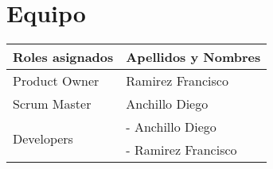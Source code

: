 \chapter{Equipo}

\begin{table}[htbp]
	\begin{center}
		\begin{tabular}{| p{5.2cm}| p{5.2cm} |}
			\hline
			\textbf{Roles asignados} & \textbf {Apellidos y Nombres}\\
			\hline
			Product Owner & Ramirez Francisco \\ \hline
			Scrum Master & Anchillo Diego \\ \hline \hline
			\multirow{2}{1cm}{Developers} & - Anchillo Diego \\ \cline{2-2}
			& - Ramirez Francisco \\ \hline
		\end{tabular}
	\end{center}
\end{table}